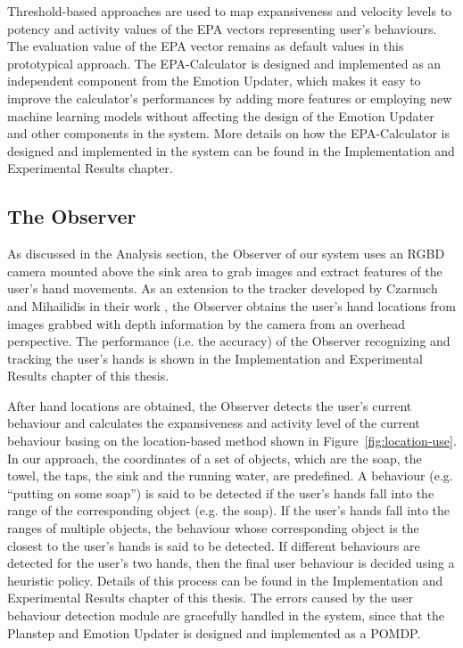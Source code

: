 Threshold-based approaches are used to map expansiveness and velocity levels to potency and activity values of the EPA vectors representing user's behaviours. The evaluation value of the EPA vector remains as default values in this prototypical approach. The EPA-Calculator is designed and implemented as an independent component from the Emotion Updater, which makes it easy to improve the calculator's performances by adding more features or employing new machine learning models without affecting the design of the Emotion Updater and other components in the system. More details on how the EPA-Calculator is designed and implemented in the system can be found in the Implementation and Experimental Results chapter.

\subsection{The Observer}

As discussed in the Analysis section, the Observer of our system uses an RGBD camera mounted above the sink area to grab images and extract features of the user's hand movements. As an extension to the tracker developed by Czarnuch and Mihailidis in their work \cite{czarnuch2014}, the Observer obtains the user's hand locations from images grabbed with depth information by the camera from an overhead perspective. The performance (i.e. the accuracy) of the Observer recognizing and tracking the user's hands is shown in the Implementation and Experimental Results chapter of this thesis. 

After hand locations are obtained, the Observer detects the user's current behaviour and calculates the expansiveness and activity level of the current behaviour basing on the location-based method shown in Figure~\ref{fig:location-use}. In our approach, the coordinates of a set of objects, which are the soap, the towel, the taps, the sink and the running water, are predefined. A behaviour (e.g. ``putting on some soap'') is said to be detected if the user's hands fall into the range of the corresponding object (e.g. the soap). If the user's hands fall into the ranges of multiple objects, the behaviour whose corresponding object is the closest to the user's hands is said to be detected. If different behaviours are detected for the user's two hands, then the final user behaviour is decided using a heuristic policy. Details of this process can be found in the Implementation and Experimental Results chapter of this thesis. The errors caused by the user behaviour detection module are gracefully handled in the system, since that the Planstep and Emotion Updater is designed and implemented as a POMDP.

